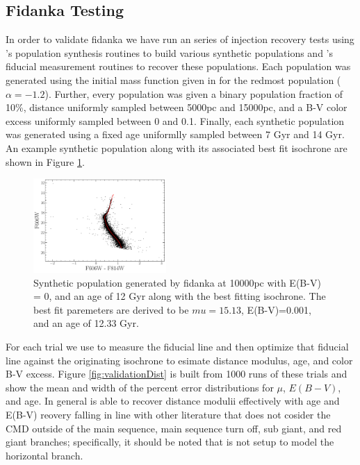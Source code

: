 \subsection{Fidanka Testing}
In order to validate fidanka we have run an series of injection recovery tests
using \fidanka's population synthesis routines to build various synthetic
populations and \fidanka's fiducial measurement routines to recover these
populations. Each population was generated using the initial mass function
given in \citep{Milone2012} for the redmost population ($\alpha=-1.2$).
Further, every population was given a binary population fraction of 10\%,
distance uniformly sampled between 5000pc and 15000pc, and a B-V color excess
uniformly sampled between 0 and 0.1. Finally, each synthetic population was
generated using a fixed age  uniformlly sampled between 7 Gyr and 14 Gyr. An
example synthetic population along with its associated best fit isochrone are
shown in Figure \ref{fig:ValidationBestFit}.

\begin{figure}
  \centering
  \includegraphics[width=0.45\textwidth]{src/figures/ExtractedIsoFit.pdf}
  \caption{Synthetic population generated by fidanka at 10000pc with E(B-V) = 0, and an age of 12 Gyr along with the best fitting isochrone. The best fit paremeters are derived to be $mu=15.13$, E(B-V)=0.001, and an age of 12.33 Gyr.}
  \label{fig:ValidationBestFit}
\end{figure}

For each trial we use \fidanka to measure the fiducial line and then optimize that fiducial line against the originating isochrone to esimate distance modulus, age, and color B-V excess. Figure \ref{fig:validationDist} is built from 1000 runs of these trials and show the mean and width of the percent error distributions for $\mu$, $E(B-V)$, and age. In general \fidanka is able to recover distance modulii effectively with age and E(B-V) reovery falling in line with other literature that does not cosider the CMD outside of the main sequence, main sequence turn off, sub giant, and red giant branches; specifically, it should be noted that \fidanka is not setup to model the horizontal branch.

